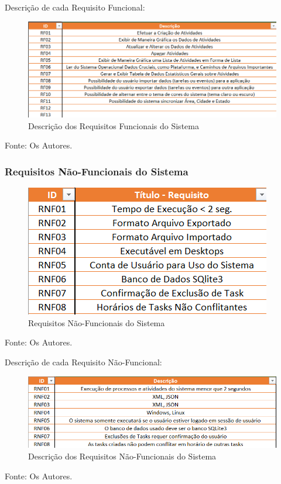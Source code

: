 \documentclass[a4paper,12pt]{article}
\begin{document}
\pagebreak
Descrição de cada Requisito Funcional:
\begin{figure}[H]
	\centering
	\includegraphics[scale=0.80]{requirements/functionals/description.png}
	\caption{Descrição dos Requisitos Funcionais do Sistema}
\end{figure}
\noindent Fonte: Os Autores.


\subsubsection{Requisitos Não-Funcionais do Sistema}
\begin{figure}[H]
	\centering
	\includegraphics[scale=0.80]{requirements/not-functionals/not-functionals.png}
	\caption{Requisitos Não-Funcionais do Sistema}
\end{figure}
\noindent Fonte: Os Autores.


Descrição de cada Requisito Não-Funcional:
\begin{figure}[H]
	\centering
	\includegraphics[scale=0.80]{requirements/not-functionals/description.png}
	\caption{Descrição dos Requisitos Não-Funcionais do Sistema}
\end{figure}
\noindent Fonte: Os Autores.
\end{document}
